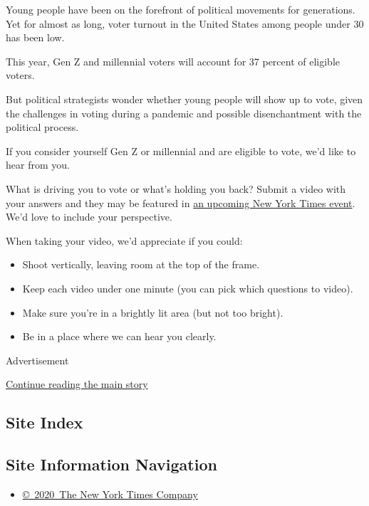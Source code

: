 Young people have been on the forefront of political movements for
generations. Yet for almost as long, voter turnout in the United States
among people under 30 has been low.

This year, Gen Z and millennial voters will account for 37 percent of
eligible voters.

But political strategists wonder whether young people will show up to
vote, given the challenges in voting during a pandemic and possible
disenchantment with the political process.

If you consider yourself Gen Z or millennial and are eligible to vote,
we'd like to hear from you.

What is driving you to vote or what's holding you back? Submit a video
with your answers and they may be featured in
\href{https://timesevents.nytimes3xbfgragh.onion/election2020/article}{an
upcoming New York Times event}. We'd love to include your perspective.

When taking your video, we'd appreciate if you could:

\begin{itemize}
\item
  Shoot vertically, leaving room at the top of the frame.
\item
  Keep each video under one minute (you can pick which questions to
  video).
\item
  Make sure you're in a brightly lit area (but not too bright).
\item
  Be in a place where we can hear you clearly.
\end{itemize}

Advertisement

\protect\hyperlink{after-bottom}{Continue reading the main story}

\hypertarget{site-index}{%
\subsection{Site Index}\label{site-index}}

\hypertarget{site-information-navigation}{%
\subsection{Site Information
Navigation}\label{site-information-navigation}}

\begin{itemize}
\tightlist
\item
  \href{https://help.nytimes3xbfgragh.onion/hc/en-us/articles/115014792127-Copyright-notice}{©~2020~The
  New York Times Company}
\end{itemize}

